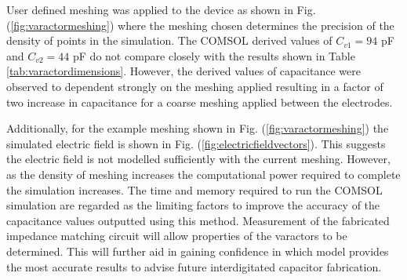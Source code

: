 User defined meshing was applied to the device as shown in Fig. (\ref{fig:varactormeshing}) where the meshing chosen determines the precision of the density of points in the simulation. The COMSOL derived values of $C_{v1}= 94$ pF and $C_{v2}= 44$ pF do not compare closely with the results shown in Table \ref{tab:varactordimensions}. However, the derived values of capacitance were observed to dependent strongly on the meshing applied resulting in a factor of two increase in capacitance for a coarse meshing applied between the electrodes. 

Additionally, for the example meshing shown in Fig. (\ref{fig:varactormeshing}) the simulated electric field is shown in Fig. (\ref{fig:electricfieldvectors}). This suggests the electric field is not modelled sufficiently with the current meshing. However, as the density of meshing increases the computational power required to complete the simulation increases. The time and memory required to run the COMSOL simulation are regarded as the limiting factors to improve the accuracy of the capacitance values outputted using this method. Measurement of the fabricated impedance matching circuit will allow properties of the varactors to be determined. This will further aid in gaining confidence in which model provides the most accurate results to advise future interdigitated capacitor fabrication.   




